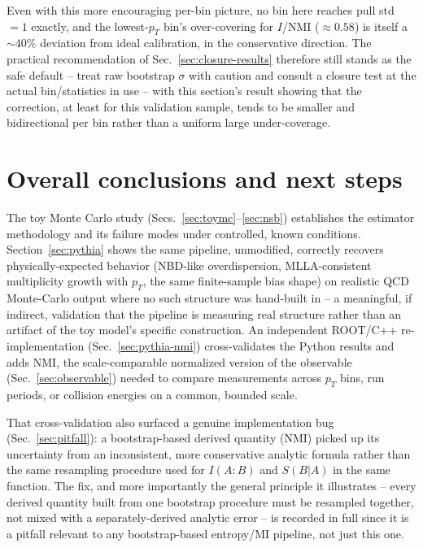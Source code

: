 \documentclass[11pt]{article}
\newcommand{\SBA}{S(B|A)}
\newcommand{\NMI}{\mathrm{NMI}}
\begin{document}
Even with this more encouraging per-bin picture, no bin here reaches
pull std $=1$ exactly, and the lowest-$p_T$ bin's over-covering for
$I$/$\NMI$ ($\approx0.58$) is itself a $\sim\!40\%$ deviation from ideal
calibration, in the conservative direction. The practical recommendation
of Sec.~\ref{sec:closure-results} therefore still stands as the safe
default -- treat raw bootstrap $\sigma$ with caution and consult a
closure test at the actual bin/statistics in use -- with this section's
result showing that the correction, at least for this validation sample,
tends to be smaller and bidirectional per bin rather than a uniform
large under-coverage.

\section{Overall conclusions and next steps}
\label{sec:conclusions}

The toy Monte Carlo study (Secs.~\ref{sec:toymc}--\ref{sec:nsb})
establishes the estimator methodology and its failure modes under
controlled, known conditions. Section~\ref{sec:pythia} shows the same
pipeline, unmodified, correctly recovers physically-expected behavior
(NBD-like overdispersion, MLLA-consistent multiplicity growth with $p_T$,
the same finite-sample bias shape) on realistic QCD Monte-Carlo output
where no such structure was hand-built in -- a meaningful, if indirect,
validation that the pipeline is measuring real structure rather than an
artifact of the toy model's specific construction. An independent
ROOT/C++ re-implementation (Sec.~\ref{sec:pythia-nmi}) cross-validates the
Python results and adds $\NMI$, the scale-comparable normalized version
of the observable (Sec.~\ref{sec:observable}) needed to compare
measurements across $p_T$ bins, run periods, or collision energies on a
common, bounded scale.

That cross-validation also surfaced a genuine implementation bug
(Sec.~\ref{sec:pitfall}): a bootstrap-based derived quantity ($\NMI$)
picked up its uncertainty from an inconsistent, more conservative
analytic formula rather than the same resampling procedure used for
$I(A{:}B)$ and $\SBA$ in the same function. The fix, and more
importantly the general principle it illustrates -- every derived
quantity built from one bootstrap procedure must be resampled together,
not mixed with a separately-derived analytic error -- is recorded in
full since it is a pitfall relevant to any bootstrap-based entropy/MI
pipeline, not just this one.
\end{document}
